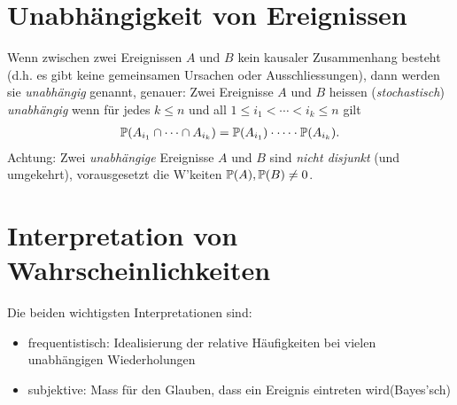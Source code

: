 \section{Unabhängigkeit von Ereignissen}
Wenn zwischen zwei Ereignissen $A$ und $B$ kein kausaler Zusammenhang besteht (d.h. es gibt keine gemeinsamen Ursachen oder Ausschliessungen), dann werden sie \emph{unabhängig} genannt, genauer: Zwei Ereignisse $A$ und $B$ heissen (\emph{stochastisch}) \emph{unabhängig} wenn für jedes $k\leq n$ und all $1\leq i_1< \cdots < i_k \leq n$ gilt
\begin{gather*}
	\mathbb P(A_{i_1}\cap \cdots \cap A_{i_{k}})=\mathbb P(A_{i_1})\cdot\cdots\cdot \mathbb P(A_{i_k}).
\end{gather*}
Achtung: Zwei \emph{unabhängige} Ereignisse $A$ und $B$ sind \emph{nicht disjunkt} (und umgekehrt), vorausgesetzt die W'keiten $\mathbb P(A), \mathbb P(B) \neq 0$.

\section{Interpretation von Wahrscheinlichkeiten}
Die beiden wichtigsten Interpretationen sind:
\begin{itemize}
	\item frequentistisch: \glqq Idealisierung der relative Häufigkeiten bei vielen unabhängigen Wiederholungen\grqq
	\item subjektive: \glqq Mass für den Glauben, dass ein Ereignis eintreten wird\grqq (Bayes'sch)
\end{itemize}
